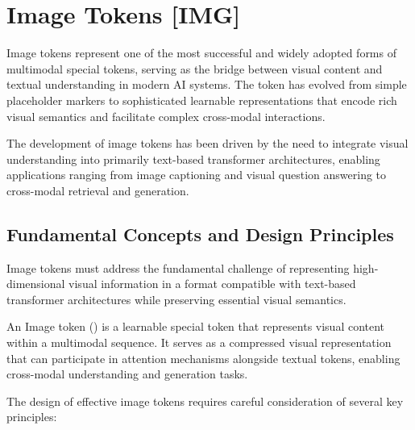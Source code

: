 
\section{Image Tokens [IMG]}

Image tokens represent one of the most successful and widely adopted forms of multimodal special tokens, serving as the bridge between visual content and textual understanding in modern AI systems. The \img{} token has evolved from simple placeholder markers to sophisticated learnable representations that encode rich visual semantics and facilitate complex cross-modal interactions.
\begin{comment}
Feedback: This is a strong opening. To make the concept even more concrete, you could add an analogy: "The [IMG] token acts as an 'ambassador' for an image, translating the rich, parallel world of pixels into the sequential, symbolic language of the transformer. Its goal is to represent the entire image in a way that a text-focused model can understand and reason about."
\end{comment}

The development of image tokens has been driven by the need to integrate visual understanding into primarily text-based transformer architectures, enabling applications ranging from image captioning and visual question answering to cross-modal retrieval and generation.

\subsection{Fundamental Concepts and Design Principles}

Image tokens must address the fundamental challenge of representing high-dimensional visual information in a format compatible with text-based transformer architectures while preserving essential visual semantics.

\begin{definition}
An Image token (\img{}) is a learnable special token that represents visual content within a multimodal sequence. It serves as a compressed visual representation that can participate in attention mechanisms alongside textual tokens, enabling cross-modal understanding and generation tasks.
\end{definition}

The design of effective image tokens requires careful consideration of several key principles:

